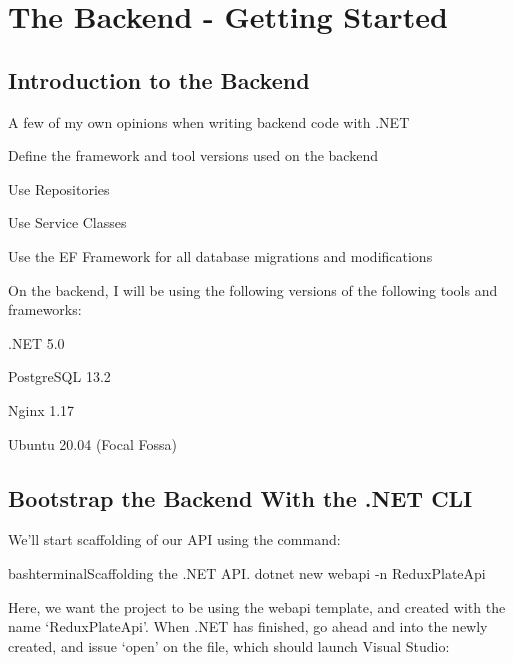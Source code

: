 \documentclass[paper=6in:9in,pagesize=pdftex,headinclude=on,footinclude=on,12pt,twoside]{scrbook}
\begin{document}
\chapter{The Backend - Getting Started}

\section{Introduction to the Backend}
\begin{arrows}
\item A few of my own opinions when writing backend code with .NET
\item Define the framework and tool versions used on the backend
\end{arrows}


\begin{arrows}
\item Use Repositories 
\item Use Service Classes
\item Use the EF Framework for all database migrations and modifications
\end{arrows}


On the backend, I will be using the following versions of the following tools and frameworks:

\begin{arrows}
\item .NET 5.0
\item PostgreSQL 13.2
\item Nginx 1.17
\item Ubuntu 20.04 (Focal Fossa)
\end{arrows}

\section{Bootstrap the Backend With the .NET CLI}


We'll start scaffolding of our API using the  command:

\begin{codeInput}{bash}{terminal}{Scaffolding the .NET API.}
dotnet new webapi -n ReduxPlateApi
\end{codeInput}

Here, we want the project to be using the webapi template, and created with the name `ReduxPlateApi'. When .NET has finished, go ahead and  into the newly created, and issue `open' on the  file, which should launch Visual Studio:
\end{document}
